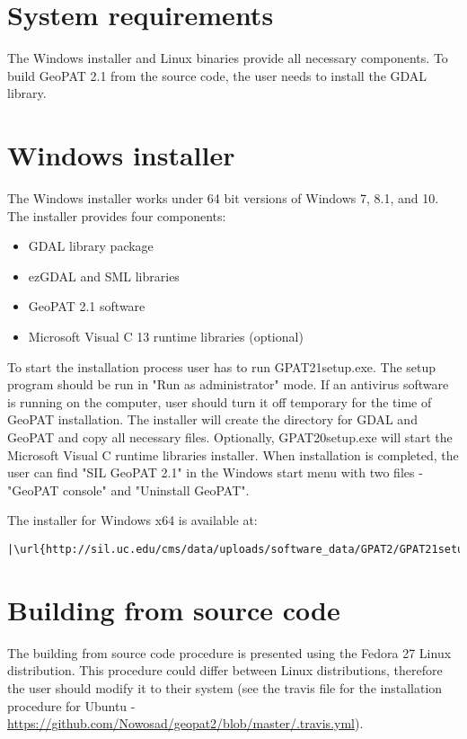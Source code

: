 \section{System requirements}

The Windows installer and Linux binaries provide all necessary components. 
To build GeoPAT 2.1 from the source code, the user needs to install the GDAL library.

\section{Windows installer}
The Windows installer works under 64 bit versions of Windows 7, 8.1, and 10.
The installer provides four components:
\begin{itemize}
  \item{GDAL library package}
  \item{ezGDAL and SML libraries}
  \item{GeoPAT 2.1 software}
  \item{Microsoft Visual C 13 runtime libraries (optional)}
\end{itemize}
To start the installation process user has to run GPAT21setup.exe.
The setup program should be run in "Run as administrator" mode.
If an antivirus software is running on the computer, user should turn it off temporary for the time of GeoPAT installation.
The installer will create the directory for GDAL and GeoPAT and copy all necessary files.
Optionally, GPAT20setup.exe will start the Microsoft Visual C runtime libraries installer.
When installation is completed, the user can find "SIL GeoPAT 2.1" in the Windows start menu with two files - "GeoPAT console" and "Uninstall GeoPAT".

The installer for Windows x64 is available at:

\begin{lstlisting}[escapechar=|]
|\url{http://sil.uc.edu/cms/data/uploads/software_data/GPAT2/GPAT21setup.exe}|
\end{lstlisting}

\section{Building from source code}

The building from source code procedure is presented using the Fedora 27 Linux distribution.
This procedure could differ between Linux distributions, therefore the user should modify it to their system (see the travis file for the installation procedure for Ubuntu - \url{https://github.com/Nowosad/geopat2/blob/master/.travis.yml}).

